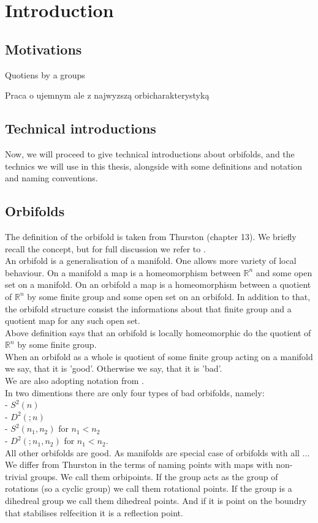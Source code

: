 \chapter{Introduction}
\setcounter{page}{8}
\section{Motivations}
Quotiens by a groups

Praca o ujemnym ale z najwyzszą orbicharakterystyką

\section{Technical introductions}
Now, we will proceed to give technical introductions about orbifolds, \Eoc and the 
technics we will use in this thesis, alongside with some definitions and notation and 
naming conventions.  
\section{Orbifolds}
The definition of the orbifold is taken from Thurston \cite{Thurston1979} (chapter 13). 
We briefly recall the concept, but for full discussion we refer to \cite{Thurston1979}. \\
An orbifold is a generalisation of a manifold. One allows more variety of local behaviour. 
On a manifold a map is a homeomorphism between $\mathbb{R}^n$ and some open set on a manifold. 
On an orbifold a map is a homeomorphism between a quotient of $\mathbb{R}^n$ by some 
finite group and some open set on an orbifold. 
In addition to that, the orbifold structure consist the informations about that finite group 
and a quotient map for any such open set. \\

Above definition says that an orbifold is locally homeomorphic do the quotient of $\mathbb{R}^n$ 
by some finite group. \\
When an orbifold as a whole is quotient of some finite group acting on a manifold we say, that 
it is 'good'. Otherwise we say, that it is 'bad'. \\

We are also adopting notation from \cite{Thurston1979}. \\

In two dimentions there are only four types of bad orbifolds, namely: \\
- $S^2(n)$ \\
- $D^2(;n)$ \\
- $S^2(n_1,n_2)$ for $n_1 < n_2$ \\
- $D^2(;n_1,n_2)$ for $n_1 < n_2$. \\
All other orbifolds are good.
As manifolds are special case of orbifolds with all ...
We differ from Thurston in the terms of naming points with maps with non-trivial groups. 
We call them orbipoints. If the group acts as the group of rotations (so a 
cyclic group) we call them rotational points. If the group is a dihedreal group we call them 
dihedreal points. And if it is point on the boundry that stabilises relfecition it is a 
reflection point.

